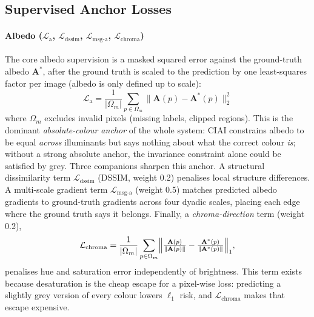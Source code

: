 \subsection{Supervised Anchor Losses}

\paragraph{Albedo ($\mathcal{L}_{\text{a}}$, $\mathcal{L}_{\text{dssim}}$,
$\mathcal{L}_{\text{msg-a}}$, $\mathcal{L}_{\text{chroma}}$)}
The core albedo supervision is a masked squared error against the ground-truth albedo
$\mathbf{A}^*$, after the ground truth is scaled to the prediction by one least-squares
factor per image (albedo is only defined up to scale):
\begin{equation}
  \mathcal{L}_{\text{a}} =
  \frac{1}{|\Omega_m|}\sum_{p \in \Omega_m}
  \bigl\| \mathbf{A}(p) - \mathbf{A}^*(p) \bigr\|_2^2
  \label{eq:l_albedo}
\end{equation}
where $\Omega_m$ excludes invalid pixels (missing labels, clipped regions).
This is the dominant \emph{absolute-colour anchor} of the whole system: CIAI
constrains albedo to be equal \emph{across} illuminants but says nothing about
what the correct colour \emph{is}; without a strong absolute anchor, the
invariance constraint alone could be satisfied by grey.
Three companions sharpen this anchor.
A structural dissimilarity term $\mathcal{L}_{\text{dssim}}$ (DSSIM, weight 0.2)
penalises local structure differences.
A multi-scale gradient term $\mathcal{L}_{\text{msg-a}}$ (weight 0.5) matches
predicted albedo gradients to ground-truth gradients across four dyadic scales,
placing each edge where the ground truth says it belongs.
Finally, a \emph{chroma-direction} term (weight 0.2),
\begin{equation}
  \mathcal{L}_{\text{chroma}} =
  \frac{1}{|\Omega_m|}\sum_{p \in \Omega_m}
  \Bigl\| \tfrac{\mathbf{A}(p)}{\|\mathbf{A}(p)\|} -
          \tfrac{\mathbf{A}^*(p)}{\|\mathbf{A}^*(p)\|} \Bigr\|_1 ,
  \label{eq:l_chroma}
\end{equation}
penalises hue and saturation error independently of brightness.
This term exists because desaturation is the cheap escape for a pixel-wise loss:
predicting a slightly grey version of every colour lowers $\ell_1$ risk, and
$\mathcal{L}_{\text{chroma}}$ makes that escape expensive.

